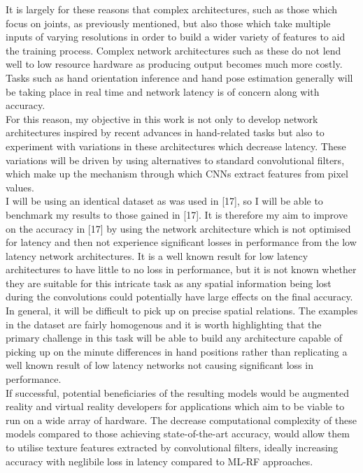 \documentclass{article}
\begin{document}
It is largely for these reasons that complex architectures, such as those which focus on joints, as previously mentioned, but also those which take multiple inputs of varying resolutions in order to build a wider variety of features to aid the training process. Complex network architectures such as these do not lend well to low resource hardware as producing output becomes much more costly. Tasks such as hand orientation inference and hand pose estimation generally will be taking place in real time and network latency is of concern along with accuracy. \\

For this reason, my objective in this work is not only to develop network architectures inspired by recent advances in hand-related tasks but also to experiment with variations in these architectures which decrease latency. These variations will be driven by using alternatives to standard convolutional filters, which make up the mechanism through which CNNs extract features from pixel values. \\

I will be using an identical dataset as was used in [17], so I will be able to benchmark my results to those gained in [17]. It is therefore my aim to improve on the accuracy in [17] by using the network architecture which is not optimised for latency and then not experience significant losses in performance from the low latency network architectures. It is a well known result for low latency architectures to have little to no loss in performance, but it is not known whether they are suitable for this intricate task as any spatial information being lost during the convolutions could potentially have large effects on the final accuracy. \\

In general, it will be difficult to pick up on precise spatial relations. The examples in the dataset are fairly homogenous and it is worth highlighting that the primary challenge in this task will be able to build any architecture capable of picking up on the minute differences in hand positions rather than replicating a well known result of low latency networks not causing significant loss in performance. \\

If successful, potential beneficiaries of the resulting models would be augmented reality and virtual reality developers for applications which aim to be viable to run on a wide array of hardware. The decrease computational complexity of these models compared to those achieving state-of-the-art accuracy, would allow them to utilise texture features extracted by convolutional filters, ideally increasing accuracy with neglibile loss in latency compared to ML-RF approaches. \\
\end{document}
